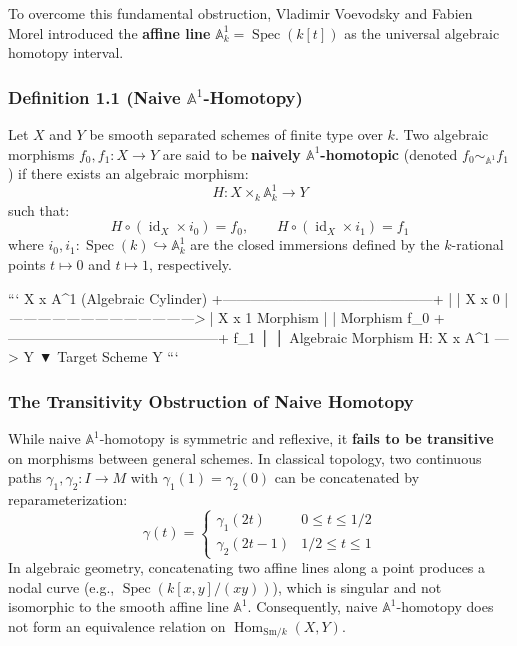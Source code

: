 \documentclass[11pt,twoside,openright]{amsbook}
\begin{document}
{To overcome this fundamental obstruction, Vladimir Voevodsky and Fabien Morel introduced the \textbf{affine line} $\mathbb{A}^1_k = \operatorname{Spec}(k[t])$ as the universal algebraic homotopy interval. 

\subsubsection{Definition 1.1 (Naive $\mathbb{A}^1$-Homotopy)}
Let $X$ and $Y$ be smooth separated schemes of finite type over $k$. Two algebraic morphisms $f_0, f_1: X \to Y$ are said to be \textbf{naively $\mathbb{A}^1$-homotopic} (denoted $f_0 \sim_{\mathbb{A}^1} f_1$) if there exists an algebraic morphism:
$$H: X \times_k \mathbb{A}^1_k \longrightarrow Y$$
such that:
$$H \circ (\operatorname{id}_X \times i_0) = f_0, \qquad H \circ (\operatorname{id}_X \times i_1) = f_1$$
where $i_0, i_1: \operatorname{Spec}(k) \hookrightarrow \mathbb{A}^1_k$ are the closed immersions defined by the $k$-rational points $t \mapsto 0$ and $t \mapsto 1$, respectively.

```
                       X x A^1 (Algebraic Cylinder)
             +---------------------------------------------+
             |                                             |
   X x {0}   | \textit{ ---------------------------------------> } |   X x {1}
   Morphism  |                                             |   Morphism
     f_0     +---------------------------------------------+     f_1
                              │
                              │ Algebraic Morphism H: X x A^1 ---> Y
                              ▼
                       Target Scheme Y
```

\subsubsection{The Transitivity Obstruction of Naive Homotopy}
While naive $\mathbb{A}^1$-homotopy is symmetric and reflexive, it \textbf{fails to be transitive} on morphisms between general schemes. In classical topology, two continuous paths $\gamma_1, \gamma_2: I \to M$ with $\gamma_1(1) = \gamma_2(0)$ can be concatenated by reparameterization:
$$\gamma(t) = \begin{cases} \gamma_1(2t) & 0 \le t \le 1/2 \\ \gamma_2(2t - 1) & 1/2 \le t \le 1 \end{cases}$$
In algebraic geometry, concatenating two affine lines along a point produces a nodal curve (e.g., $\operatorname{Spec}(k[x, y]/(xy))$), which is singular and not isomorphic to the smooth affine line $\mathbb{A}^1$. Consequently, naive $\mathbb{A}^1$-homotopy does not form an equivalence relation on $\operatorname{Hom}_{\mathrm{Sm}/k}(X, Y)$.

}
\end{document}

